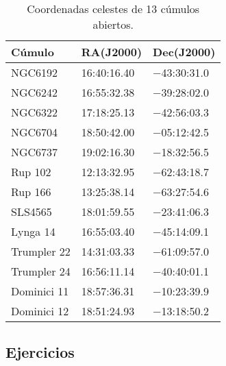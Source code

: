 \begin{answers}
\begin{table}
\renewcommand{\tablename}{Tabla}
\centering
\begin{tabular}{L{0.15\textwidth} R{0.15\textwidth} R{0.15\textwidth}} 
		\toprule
		\textbf{Cúmulo} & \textbf{RA(J2000)} & \textbf{Dec(J2000)}\\%
		\midrule
NGC6192 &16:40:16.40 & $-$43:30:31.0\\
NGC6242 & 16:55:32.38& $-$39:28:02.0\\
NGC6322&17:18:25.13  & $-$42:56:03.3\\
NGC6704 &18:50:42.00 & $-$05:12:42.5\\
NGC6737 &19:02:16.30 & $-$18:32:56.5\\
Rup 102 & 12:13:32.95& $-$62:43:18.7\\
Rup 166 & 13:25:38.14& $-$63:27:54.6\\
SLS4565& 18:01:59.55&$-$23:41:06.3\\
Lynga 14& 16:55:03.40&$-$45:14:09.1\\
Trumpler 22& 14:31:03.33&$-$61:09:57.0\\
Trumpler 24& 16:56:11.14&$-$40:40:01.1\\
Dominici 11& 18:57:36.31&$-$10:23:39.9\\
Dominici 12& 18:51:24.93&$-$13:18:50.2\\
\bottomrule
\end{tabular}
\caption{Coordenadas celestes de 13 cúmulos abiertos.}
\label{cum} %
\end{table}

 


\end{answers}

\bigskip

 \bigskip

 

\subsection{Ejercicios}


 

